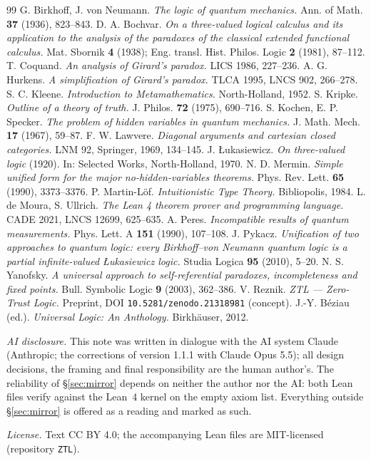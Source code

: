 \documentclass[11pt]{article}
\theoremstyle{remark}
\begin{document}
\begin{thebibliography}{99}
 G. Birkhoff, J. von Neumann. \emph{The logic of quantum
mechanics.} Ann. of Math. \textbf{37} (1936), 823--843.
 D. A. Bochvar. \emph{On a three-valued logical calculus and
its application to the analysis of the paradoxes of the classical extended
functional calculus.} Mat. Sbornik \textbf{4} (1938); Eng. transl. Hist.
Philos. Logic \textbf{2} (1981), 87--112.
 T. Coquand. \emph{An analysis of Girard's paradox.} LICS
1986, 227--236.
 A. G. Hurkens. \emph{A simplification of Girard's paradox.}
TLCA 1995, LNCS 902, 266--278.
 S. C. Kleene. \emph{Introduction to Metamathematics.}
North-Holland, 1952.
 S. Kripke. \emph{Outline of a theory of truth.} J. Philos.
\textbf{72} (1975), 690--716.
 S. Kochen, E. P. Specker. \emph{The problem of hidden
variables in quantum mechanics.} J. Math. Mech. \textbf{17} (1967), 59--87.
 F. W. Lawvere. \emph{Diagonal arguments and cartesian closed
categories.} LNM 92, Springer, 1969, 134--145.
 J. \L ukasiewicz. \emph{On three-valued logic} (1920).
In: Selected Works, North-Holland, 1970.
 N. D. Mermin. \emph{Simple unified form for the major
no-hidden-variables theorems.} Phys. Rev. Lett. \textbf{65} (1990),
3373--3376.
 P. Martin-L\"of. \emph{Intuitionistic Type Theory.} Bibliopolis,
1984.
 L. de Moura, S. Ullrich. \emph{The Lean 4 theorem prover and
programming language.} CADE 2021, LNCS 12699, 625--635.
 A. Peres. \emph{Incompatible results of quantum
measurements.} Phys. Lett. A \textbf{151} (1990), 107--108.
 J. Pykacz. \emph{Unification of two approaches to quantum
logic: every Birkhoff--von Neumann quantum logic is a partial infinite-valued
{\L}ukasiewicz logic.} Studia Logica \textbf{95} (2010), 5--20.
 N. S. Yanofsky. \emph{A universal approach to
self-referential paradoxes, incompleteness and fixed points.} Bull. Symbolic
Logic \textbf{9} (2003), 362--386.
 V. Reznik. \emph{ZTL --- Zero-Trust Logic.} Preprint, DOI
\texttt{10.5281/zenodo.21318981} (concept).
 J.-Y. B\'eziau (ed.). \emph{Universal Logic: An Anthology.}
Birkh\"auser, 2012.
\end{thebibliography}

\vspace{1em}
\noindent\emph{AI disclosure.} This note was written in dialogue with the AI
system Claude (Anthropic; the corrections of version 1.1.1 with Claude Opus 5.5); all design decisions, the framing and final
responsibility are the human author's. The reliability of \S\ref{sec:mirror}
depends on neither the author nor the AI: both Lean files verify against the
Lean~4 kernel on the empty axiom list. Everything outside \S\ref{sec:mirror}
is offered as a reading and marked as such.

\smallskip
\noindent\emph{License.} Text CC BY 4.0; the accompanying Lean files are
MIT-licensed (repository \texttt{ZTL}).
\end{document}
